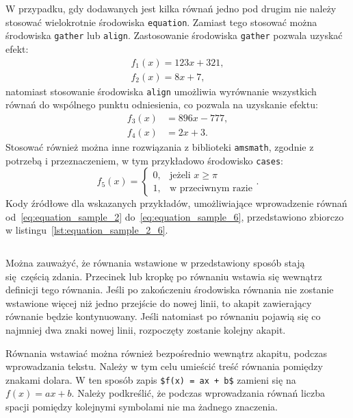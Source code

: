 W przypadku, gdy dodawanych jest kilka równań jedno pod drugim nie należy stosować wielokrotnie środowiska \verb|equation|. Zamiast tego stosować można środowiska \verb|gather| lub \verb|align|. Zastosowanie środowiska \verb|gather| pozwala uzyskać efekt:
\begin{gather}
f_{1}(x) = 123 x + 321 \label{eq:equation_sample_2}, \\
f_{2}(x) = 8 x + 7 \label{eq:equation_sample_3},
\end{gather}
natomiast stosowanie środowiska \verb|align| umożliwia wyrównanie wszystkich równań do wspólnego punktu odniesienia, co pozwala na uzyskanie efektu:
\begin{align}
f_{3}(x) &= 896 x - 777 \label{eq:equation_sample_4}, \\
f_{4}(x) &= 2 x + 3 \label{eq:equation_sample_5}.
\end{align}
Stosować również można inne rozwiązania z biblioteki \verb|amsmath|, zgodnie z potrzebą i przeznaczeniem, w tym przykładowo środowisko \verb|cases|:
\begin{equation}
f_{5}(x) =
\begin{cases}
0, & \text{jeżeli $x \ge \pi$}  \\
1, & \text{w przeciwnym razie}
\end{cases}
\label{eq:equation_sample_6}.
\end{equation}
Kody źródłowe dla wskazanych przykładów, umożliwiające wprowadzenie równań od~\eqref{eq:equation_sample_2} do~\eqref{eq:equation_sample_6}, przedstawiono zbiorczo w listingu~\ref{lst:equation_sample_2_6}.

\begin{listing}[htb]
\inputminted{latex}{skrypty/overleaf_sample.tex}
\end{listing}

Można zauważyć, że równania wstawione w przedstawiony sposób stają się częścią zdania. Przecinek lub kropkę po równaniu wstawia się wewnątrz definicji tego równania. Jeśli po zakończeniu środowiska równania nie zostanie wstawione więcej niż jedno przejście do nowej linii, to akapit zawierający równanie będzie kontynuowany. Jeśli natomiast po równaniu pojawią się co najmniej dwa znaki nowej linii, rozpoczęty zostanie kolejny akapit.

Równania wstawiać można również bezpośrednio wewnątrz akapitu, podczas wprowadzania tekstu. Należy w tym celu umieścić treść równania pomiędzy znakami dolara. W ten sposób zapis \verb|$f(x) = ax + b$| zamieni się na $f(x) = ax + b$. Należy podkreślić, że podczas wprowadzania równań liczba spacji pomiędzy kolejnymi symbolami nie ma żadnego znaczenia.

